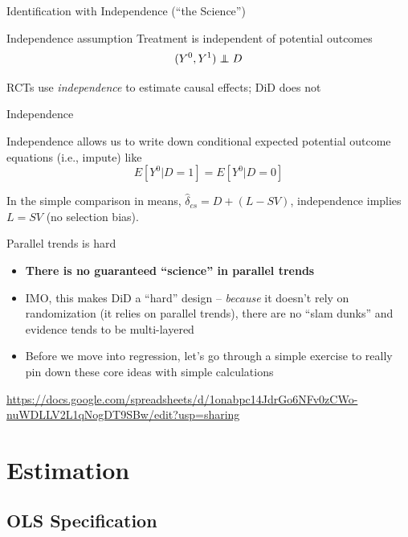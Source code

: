 \documentclass{beamer}
\newcommand\independent{\protect\mathpalette{\protect\independenT}{\perp}}
\def\independenT#1#2{\mathrel{\rlap{$#1#2$}\mkern2mu{#1#2}}}
\begin{document}
\begin{frame}{Identification with Independence (``the Science'')}


\begin{block}{Independence assumption}
Treatment is independent of potential outcomes  $$(Y^0,Y^1)\independent{D}$$
\end{block}	

RCTs use \emph{independence} to estimate causal effects; DiD does not

\end{frame}

\begin{frame}{Independence}

Independence allows us to write down conditional expected potential outcome equations (i.e., impute) like $$E[Y^0|D=1]=E[Y^0|D=0]$$ 

\bigskip

In the simple comparison in means, $\widehat{\delta}_{cs} = D + (L-SV)$, independence implies $L=SV$ (no selection bias).

\end{frame}


\begin{frame}{Parallel trends is hard}

\begin{itemize}
\item \textbf{There is no guaranteed ``science'' in parallel trends}
\item IMO, this makes DiD a ``hard'' design -- \emph{because} it doesn't rely on randomization (it relies on parallel trends), there are no ``slam dunks'' and evidence tends to be multi-layered
\item Before we move into regression, let's go through a simple exercise to really pin down these core ideas with simple calculations
\end{itemize}

\bigskip 

\url{https://docs.google.com/spreadsheets/d/1onabpc14JdrGo6NFv0zCWo-nuWDLLV2L1qNogDT9SBw/edit?usp=sharing}

\end{frame}

\section{Estimation}

\subsection{OLS Specification}
\end{document}
